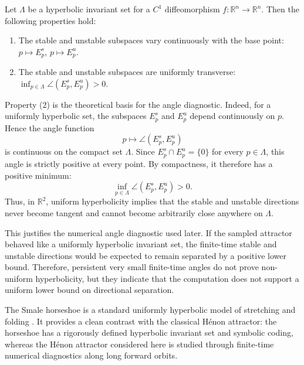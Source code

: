 \begin{proposition}
Let \(\Lambda\) be a hyperbolic invariant set for a \(C^1\) diffeomorphism
\(f:\mathbb R^n\to\mathbb R^n\). Then the following properties hold:

\begin{enumerate}[label=(\arabic*)]
    \item The stable and unstable subspaces vary continuously with the base point:
    \(
    p\mapsto E_p^s\), 
    \(p\mapsto E_p^u.
    \)

    \item The stable and unstable subspaces are uniformly transverse:
    \(
    \inf_{p\in\Lambda}\angle(E_p^s,E_p^u)>0.\)
\end{enumerate}
\end{proposition}


Property (2) is the theoretical basis for the angle diagnostic. Indeed, for a uniformly hyperbolic set, the subspaces \(E_p^s\) and \(E_p^u\) depend continuously on \(p\). Hence the angle function
\[
p\mapsto \angle(E_p^s,E_p^u)
\]
is continuous on the compact set \(\Lambda\). Since \(E_p^s\cap E_p^u=\{0\}\) for every \(p\in\Lambda\), this angle is strictly positive at every point. By compactness, it therefore has a positive minimum:
\[
\inf_{p\in\Lambda}\angle(E_p^s,E_p^u)>0.
\]
Thus, in \(\mathbb R^2\), uniform hyperbolicity implies that the stable and unstable directions never become tangent and cannot become arbitrarily close anywhere on \(\Lambda\).

This justifies the numerical angle diagnostic used later. If the sampled attractor behaved like a uniformly hyperbolic invariant set, the finite-time stable and unstable directions would be expected to remain separated by a positive lower bound. Therefore, persistent very small finite-time angles do not prove non-uniform hyperbolicity, but they indicate that the computation does not support a uniform lower bound on directional separation.



\begin{remark}
The Smale horseshoe is a standard uniformly hyperbolic model of stretching and folding \cite{Robinson1999}. It provides a clean contrast with the classical Hénon attractor: the horseshoe has a rigorously defined hyperbolic invariant set and symbolic coding, whereas the Hénon attractor considered here is studied through finite-time numerical diagnostics along long forward orbits. 
\end{remark}






